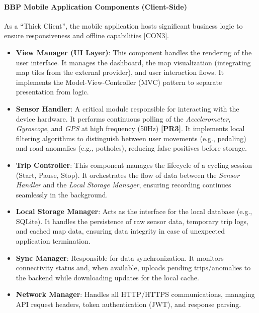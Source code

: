 \paragraph{BBP Mobile Application Components (Client-Side)}
As a ``Thick Client'', the mobile application hosts significant business logic to ensure responsiveness and offline capabilities [CON3].

\begin{itemize}
    \item \textbf{View Manager (UI Layer)}: This component handles the rendering of the user interface. It manages the dashboard, the map visualization (integrating map tiles from the external provider), and user interaction flows. It implements the Model-View-Controller (MVC) pattern to separate presentation from logic.

    \item \textbf{Sensor Handler}: A critical module responsible for interacting with the device hardware. It performs continuous polling of the \textit{Accelerometer}, \textit{Gyroscope}, and \textit{GPS} at high frequency (50Hz) \textbf{[PR3]}. It implements local filtering algorithms to distinguish between user movements (e.g., pedaling) and road anomalies (e.g., potholes), reducing false positives before storage.

    \item \textbf{Trip Controller}: This component manages the lifecycle of a cycling session (Start, Pause, Stop). It orchestrates the flow of data between the \textit{Sensor Handler} and the \textit{Local Storage Manager}, ensuring recording continues seamlessly in the background.

    \item \textbf{Local Storage Manager}: Acts as the interface for the local database (e.g., SQLite). It handles the persistence of raw sensor data, temporary trip logs, and cached map data, ensuring data integrity in case of unexpected application termination.

    \item \textbf{Sync Manager}: Responsible for data synchronization. It monitors connectivity status and, when available, uploads pending trips/anomalies to the backend while downloading updates for the local cache.

    \item \textbf{Network Manager}: Handles all HTTP/HTTPS communications, managing API request headers, token authentication (JWT), and response parsing.
\end{itemize}
\clearpage

